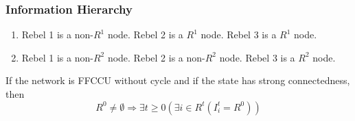 \documentclass[10pt]{beamer}
\begin{document}
\begin{frame}
  \frametitle{Information Hierarchy}

\begin{enumerate}
\item Rebel 1 is a non-$R^1$ node. Rebel 2 is a $R^1$ node. Rebel 3 is a $R^1$ node.
\item Rebel 1 is a non-$R^2$ node. Rebel 2 is a non-$R^2$ node. Rebel 3 is a $R^2$ node.
\end{enumerate}


 \begin{center}
\end{center}

\begin{theorem}
\label{lemma_empty}
If the network is FFCCU without cycle and if the state has strong connectedness, then 
\[R^0\neq \emptyset \Rightarrow \exists t\geq 0(\exists i\in R^t(I^t_i=R^0))\]
\end{theorem} 
\end{frame}
\end{document}
